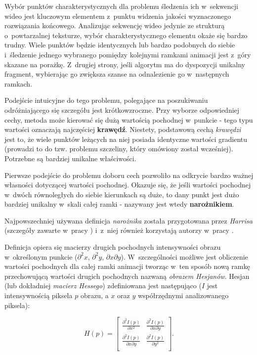     Wybór punktów charakterystycznych dla problemu śledzenia ich w~sekwencji wideo jest kluczowym elementem z~punktu widzenia jakości wyznaczonego rozwiązania końcowego. Analizując sekwencję wideo jedynie ze strukturą o~powtarzalnej teksturze, wybór charakterystycznego elementu okaże się bardzo trudny. Wiele punktów będzie identycznych lub bardzo podobnych do siebie i~śledzenie jednego wybranego pomiędzy kolejnymi ramkami animacji jest z~góry skazane na porażkę. Z~drugiej strony, jeśli algorytm ma do dyspozycji unikalny fragment, wybierając go zwiększa szanse na odnalezienie go w~następnych ramkach.

    Podejście intuicyjne do tego problemu, polegające na poszukiwaniu odróżniającego się szczegółu jest krótkowzroczne. Przy wyborze odpowiedniej cechy, metoda może kierować się dużą wartością pochodnej w~punkcie - tego typu wartości oznaczają najczęściej \textbf{krawędź}. Niestety, podstawową cechą \textit{krawędzi} jest to, że wiele punktów leżących na niej posiada identyczne wartości gradientu (prowadzi to do tzw. problemu szczeliny, który omówiony został wcześniej). Potrzebne są bardziej unikalne właściwości.

    Pierwsze podejście do problemu doboru cech pozwoliło na odkrycie bardzo ważnej własności dotyczącej wartości pochodnej. Okazuje się, że jeśli wartości pochodnej w~dwóch równoległych do siebie kierunkach są duże, to dany punkt jest dużo bardziej unikalny w~skali całej ramki - nazywany jest wtedy \textbf{narożnikiem}.

    Najpowszechniej używana definicja \textit{narożnika} została przygotowana przez \textit{Harrisa} (szczegóły zawarte w~pracy \cite{Harris88}) i~z~niej również korzystają autorzy w~pracy \cite{GoodFeaturesToTrack94}.

    Definicja opiera się macierzy drugich pochodnych intensywności obrazu w~określonym punkcie ($\partial^2 x$, $\partial^2 y$, $\partial x\partial y$). W~szczególności możliwe jest obliczenie wartości pochodnych dla całej ramki animacji tworząc w~ten sposób nową ramkę przechowującą wartości drugich pochodnych nazwaną \textit{obrazem Hesjanów}. Hesjan (lub dokładniej \textit{macierz Hessego}) zdefiniowana jest następująco ($I$ jest intensywnością piksela $p$ obrazu, a $x$ oraz $y$ współrzędnymi analizowanego piksela):

      \begin{equation}
        H(p) =
          \begin{bmatrix}
            \frac{\partial^2 I(p)}{\partial x^2} & \frac{\partial^2 I(p)}{\partial x\partial y} \\
            \frac{\partial^2 I(p)}{\partial x\partial y} & \frac{\partial^2 I(p)}{\partial y^2} \\
          \end{bmatrix}.
      \end{equation}

